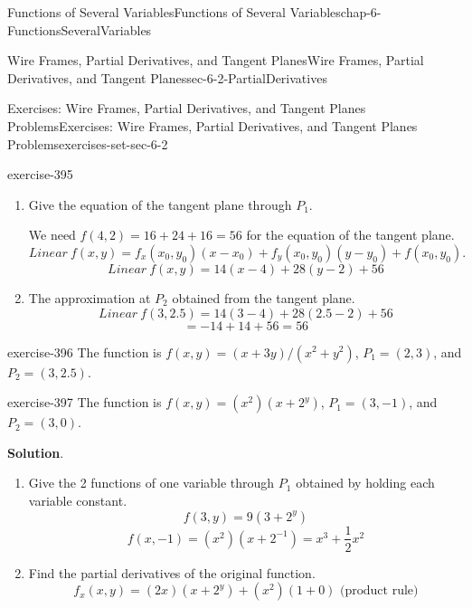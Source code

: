 \documentclass[oneside,10pt,]{book}
\numberwithin{equation}{section}
\begin{document}
\begin{chapterptx}{Functions of Several Variables}{}{Functions of Several Variables}{}{}{chap-6-FunctionsSeveralVariables}
\begin{sectionptx}{Wire Frames, Partial Derivatives, and Tangent Planes}{}{Wire Frames, Partial Derivatives, and Tangent Planes}{}{}{sec-6-2-PartialDerivatives}
\begin{exercises-subsection-numberless}{Exercises: Wire Frames, Partial Derivatives, and Tangent Planes Problems}{}{Exercises: Wire Frames, Partial Derivatives, and Tangent Planes Problems}{}{}{exercises-set-sec-6-2}
\begin{exercisegroup}
\begin{divisionexerciseeg}{1}{}{}{exercise-395}
\begin{enumerate}[label=(\alph*)]
\item\hypertarget{li-620}{}\hypertarget{p-2252}{}%
Give the equation of the tangent plane through \(P_1\).%
\par
\hypertarget{p-2253}{}%
We need \(f(4,2)=16+24+16=56\) for the equation of the tangent plane.%
%
\begin{equation*}
Linear\ f(x ,y)=f_x (x_0,y_0 )(x-x_0 )+f_y (x_0,y_0 )(y-y_0 )+f(x_0,y_0 ).
\end{equation*}
%
\begin{equation*}
Linear\ f(x,y)=14(x-4)+28(y-2)+56
\end{equation*}
\item\hypertarget{li-621}{}\hypertarget{p-2254}{}%
The approximation at \(P_2\) obtained from the tangent plane.%
%
\begin{equation*}
Linear\ f(3,2.5)=14(3-4)+28(2.5-2)+56
\end{equation*}
%
\begin{equation*}
= -14+14+56=56
\end{equation*}
\end{enumerate}
\end{divisionexerciseeg}%
\begin{divisionexerciseeg}{2}{}{}{exercise-396}%
\hypertarget{p-2255}{}%
The function is \(f(x,y)=(x+3y)/(x^2+y^2 )\), \(P_1=(2,3)\), and \(P_2=(3,2.5)\).%
\end{divisionexerciseeg}%
\begin{divisionexerciseeg}{3}{}{}{exercise-397}%
\hypertarget{p-2256}{}%
The function is \(f(x,y)=(x^2)(x+2^y)\), \(P_1=(3,-1)\), and \(P_2=(3,0)\).%
\par\smallskip%
\noindent\textbf{Solution}.\hypertarget{solution-200}{}\quad%
\leavevmode%
\begin{enumerate}[label=(\alph*)]
\item\hypertarget{li-622}{}\hypertarget{p-2257}{}%
Give the 2 functions of one variable through \(P_1\) obtained by holding each variable constant.%
%
\begin{equation*}
f(3,y)=9(3+2^y)
\end{equation*}
%
\begin{equation*}
f(x,-1)=(x^2 )(x+2^{-1} )= x^3+\frac{1}{2} x^2
\end{equation*}
\item\hypertarget{li-623}{}\hypertarget{p-2258}{}%
Find the partial derivatives of the original function.%
%
\begin{equation*}
f_x  (x,y)=(2x)(x+2^y )+(x^2 )(1+0 )  \text{ (product rule)}
\end{equation*}

\end{enumerate}
\end{divisionexerciseeg}
\end{exercisegroup}
\end{exercises-subsection-numberless}
\end{sectionptx}
\end{chapterptx}
\end{document}
